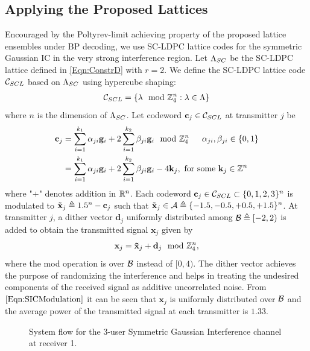 \documentclass[journal,twocolumn]{IEEEtran}
\begin{document}
\subsection{Applying the Proposed Lattices}
Encouraged by the Poltyrev-limit achieving property of the proposed lattice ensembles under BP decoding, we use SC-LDPC lattice codes for the symmetric Gaussian IC in the very strong interference region. Let $\Lambda_{SC}$ be the SC-LDPC lattice defined in \eqref{Eqn:ConstrD} with $r=2$.
We define the SC-LDPC lattice code $\mathcal{C}_{SCL}$ based on $\Lambda_{SC}$ using hypercube shaping:
\begin{align}
\mathcal{C}_{SCL}=\left\lbrace \mathbf{\lambda} \mod {\mathbb{Z}}_{4}^{n}: \mathbf{\lambda} \in \Lambda \right\rbrace
\end{align}
where $n$ is the dimension of $\Lambda_{SC}$. Let codeword $\mathbf{c}_{j}\in\mathcal{C}_{SCL}$ at transmitter $j$ be
\begin{align}
\mathbf{c}_{j}&= \sum_{i=1}^{k_{1}}\alpha_{ji}\mathbf{g}_i+2\sum_{i=1}^{k_{2}}\beta_{ji}\mathbf{g}_i \mod {\mathbb{Z}}_{4}^{n}\hspace{15pt} \alpha_{ji},\beta_{ji}\in \{0,1\}\\
\label{Eqn:SICCodeword}
&= \sum_{i=1}^{k_{1}}\alpha_{ji}\mathbf{g}_i+2\sum_{i=1}^{k_{2}}\beta_{ji}\mathbf{g}_i -4\mathbf{k}_{j}, \ \mbox{for some} \ \mathbf{k}_{j}\in\mathbb{Z}^{n}
\end{align}
where "$+$" denotes addition in $\mathbb{R}^{n}$. Each codeword $\mathbf{c}_{j}\in\mathcal{C}_{SCL}\subset\{0,1,2,3\}^{n}$ is modulated to $\mathbf{\tilde{x}}_{j}\triangleq 1.5^{n}-\mathbf{c}_{j}$ such that $\mathbf{\tilde{x}}_{j}\in\mathcal{A}\triangleq\{-1.5,-0.5,+0.5,+1.5\}^{n}$. At transmitter $j$, a dither vector $\mathbf{d}_{j}$ uniformly distributed among $\mathcal{B}\triangleq [-2,2)$ is added to obtain the transmitted signal $\mathbf{x}_j$ given by
\begin{align}
\mathbf{x}_{j}=\mathbf{\tilde{x}}_{j}+\mathbf{d}_{j} \mod {\mathbb{Z}}_{4}^{n},
\label{Eqn:SICdither}
\end{align}
where the mod operation is over $\mathcal{B}$ instead of $[0,4)$. The dither vector achieves the purpose of randomizing the interference and helps in treating the undesired components of the received signal as additive uncorrelated noise. From $\eqref{Eqn:SICModulation}$ it can be seen that $\mathbf{x}_{j}$ is uniformly distributed over $\mathcal{B}$ and the average power of the transmitted signal at each transmitter is $1.33$.

\begin{figure}[t]
\centering
\resizebox{0.9\textwidth}{!}{

}
\caption{System flow for the 3-user Symmetric Gaussian Interference channel at receiver 1.}
\label{Fig:SIC_decoder}
\end{figure}
\end{document}

